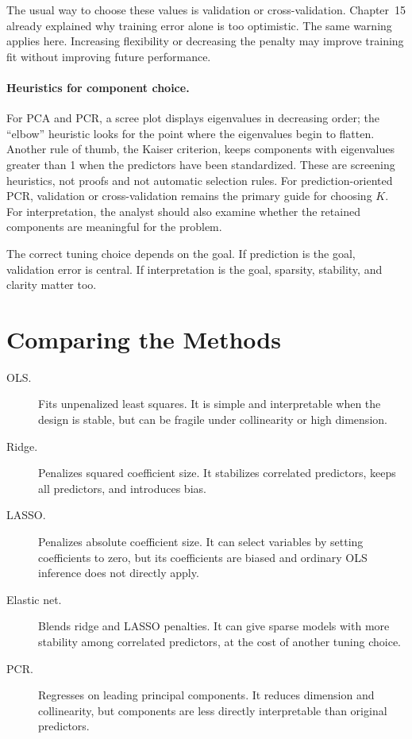 The usual way to choose these values is validation or cross-validation.  Chapter~15 already explained why training error alone is too optimistic.  The same warning applies here.  Increasing flexibility or decreasing the penalty may improve training fit without improving future performance.

\paragraph{Heuristics for component choice.}
For PCA and PCR, a scree plot displays eigenvalues in decreasing order; the ``elbow'' heuristic looks for the point where the eigenvalues begin to flatten.  Another rule of thumb, the Kaiser criterion, keeps components with eigenvalues greater than 1 when the predictors have been standardized.  These are screening heuristics, not proofs and not automatic selection rules.  For prediction-oriented PCR, validation or cross-validation remains the primary guide for choosing \(K\).  For interpretation, the analyst should also examine whether the retained components are meaningful for the problem.

The correct tuning choice depends on the goal.  If prediction is the goal, validation error is central.  If interpretation is the goal, sparsity, stability, and clarity matter too.

\section{Comparing the Methods}

\begin{description}
  \item[OLS.] Fits unpenalized least squares.  It is simple and interpretable when the design is stable, but can be fragile under collinearity or high dimension.
  \item[Ridge.] Penalizes squared coefficient size.  It stabilizes correlated predictors, keeps all predictors, and introduces bias.
  \item[LASSO.] Penalizes absolute coefficient size.  It can select variables by setting coefficients to zero, but its coefficients are biased and ordinary OLS inference does not directly apply.
  \item[Elastic net.] Blends ridge and LASSO penalties.  It can give sparse models with more stability among correlated predictors, at the cost of another tuning choice.
  \item[PCR.] Regresses on leading principal components.  It reduces dimension and collinearity, but components are less directly interpretable than original predictors.
\end{description}

